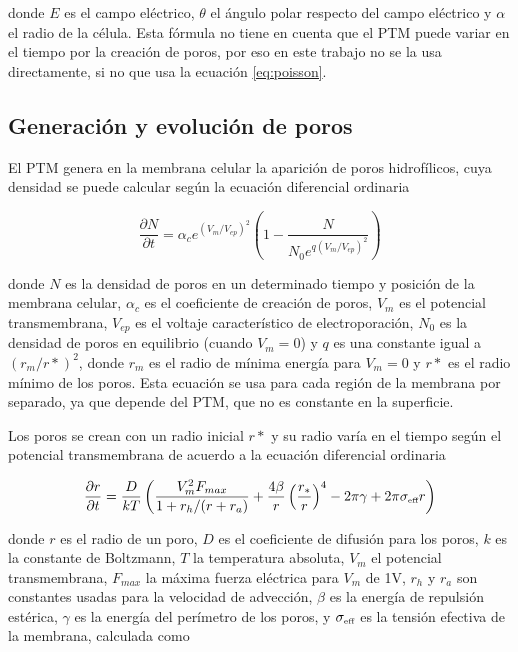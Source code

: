 donde $E$ es el campo eléctrico, $\theta$ el ángulo polar respecto del campo eléctrico y $\alpha$ el radio de la célula. Esta fórmula no tiene en cuenta que el PTM puede variar en el tiempo por la creación de poros, por eso en este trabajo no se la usa directamente, si no que usa la ecuación \ref{eq:poisson}.

\subsection*{Generación y evolución de poros}
El PTM genera en la membrana celular la aparición de poros hidrofílicos, cuya densidad se puede calcular según la ecuación diferencial ordinaria \cite{krass-viejo}

\begin{equation} \label{eq:poros-crea}
	\frac{\partial N}{\partial t} = \alpha_c e^{(V_m/V_{ep})^2} \left( 1 - \frac{N}{N_0 e^{q \left(V_m/V_{ep} \right) ^2}} \right)
\end{equation}

donde $N$ es la densidad de poros en un determinado tiempo y posición de la membrana celular, $\alpha_c$ es el coeficiente de creación de poros, $V_m$ es el potencial transmembrana, $V_{ep}$ es el voltaje característico de electroporación, $N_0$ es la densidad de poros en equilibrio (cuando $V_m = 0$) y $q$ es una constante igual a $(r_m / r*)^2$, donde $r_m$ es el radio de mínima energía para $V_m = 0$ y $r*$ es el radio mínimo de los poros. Esta ecuación se usa para cada región de la membrana por separado, ya que depende del PTM, que no es constante en la superficie. 

Los poros se crean con un radio inicial $r*$ y su radio varía en el tiempo según el potencial transmembrana de acuerdo a la ecuación diferencial ordinaria \cite{c7-krass07}

\begin{equation} \label{eq:poros-radio}
	\frac{\partial r}{\partial t} = \frac{D}{kT} \left( \frac{V_m^2 F_{max}}{1+r_h / (r+r_a)} + \frac{4 \beta}{r} \left(\frac{r_*}{r}\right)^4 - 2 \pi \gamma + 2 \pi \sigma_{\textrm{\tiny eff}} r\right)
\end{equation}

donde $r$ es el radio de un poro, $D$ es el coeficiente de difusión para los poros, $k$ es la constante de Boltzmann, $T$ la temperatura absoluta, $V_m$ el potencial transmembrana, $F_{max}$ la máxima fuerza eléctrica para $V_m$ de 1V, $r_h$ y $r_a$ son constantes usadas para la velocidad de advección, $\beta$ es la energía de repulsión estérica, $\gamma$ es la energía del perímetro de los poros, y $\sigma_{\textrm{\tiny eff}}$ es la tensión efectiva de la membrana, calculada como

